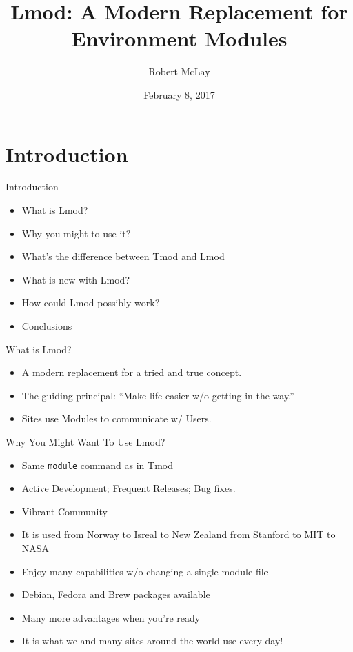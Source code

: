 \documentclass{beamer}
\title{Lmod: A Modern Replacement for Environment Modules}
\author{Robert McLay}
\institute{The Texas Advanced Computing Center}
\date{February 8, 2017}  %
\begin{document}
\begin{frame}
  \titlepage
\end{frame}

\section{Introduction}

\begin{frame}{Introduction}
  \begin{itemize}
    \item What is Lmod?
    \item Why you might to use it?
    \item What's the difference between Tmod and Lmod
    \item What is new with Lmod?
    \item How could Lmod possibly work?
    \item Conclusions
  \end{itemize}
\end{frame}

\begin{frame}{What is Lmod?}
  \begin{itemize}
    \item A modern replacement for a tried and true concept.
    \item The guiding principal: ``Make life easier w/o getting in
      the way.''
    \item Sites use Modules to communicate w/ Users.
  \end{itemize}
\end{frame}

\begin{frame}{Why You Might Want To Use Lmod?}
  \begin{itemize}
    \item Same \texttt{module} command as in Tmod
    \item Active Development;  Frequent Releases; Bug fixes.
    \item Vibrant Community
    \item It is used from Norway to Isreal to New Zealand from Stanford to MIT to NASA
    \item Enjoy many capabilities w/o changing a single module file
    \item Debian, Fedora and Brew packages available
    \item Many more advantages when you're ready
    \item It is what we and many sites around the world use every day!
  \end{itemize}
\end{frame}
\end{document}
